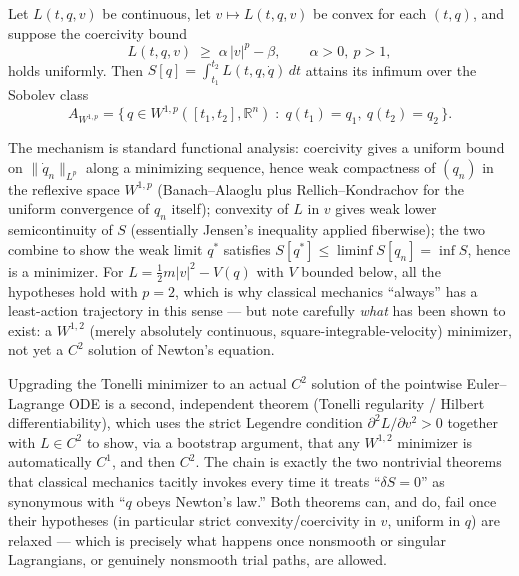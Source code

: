 \begin{theorem}
\label{tonelli}
Let $L(t,q,v)$ be continuous, let $v\mapsto L(t,q,v)$ be convex for each $(t,q)$, and suppose the coercivity bound
\[
L(t,q,v) \;\ge\; \alpha\,|v|^p - \beta, \qquad \alpha>0,\ p>1,
\]
holds uniformly. Then $S[q]=\int_{t_1}^{t_2}L(t,q,\dot q)\,dt$ attains its infimum over the Sobolev class
\[
A_{W^{1,p}} = \bigl\{\, q\in W^{1,p}([t_1,t_2],\mathbb{R}^n) \;:\; q(t_1)=q_1,\ q(t_2)=q_2 \,\bigr\}.
\]
\end{theorem}

The mechanism is standard functional analysis: coercivity gives a uniform bound
on $\|\dot q_n\|_{L^p}$ along a minimizing sequence, hence weak compactness of
$(q_n)$ in the reflexive space $W^{1,p}$ (Banach--Alaoglu plus
Rellich--Kondrachov for the uniform convergence of $q_n$ itself); convexity of
$L$ in $v$ gives weak lower semicontinuity of $S$ (essentially Jensen's
inequality applied fiberwise); the two combine to show the weak limit $q^\ast$
satisfies $S[q^\ast]\le \liminf S[q_n] = \inf S$, hence is a minimizer. For
$L=\tfrac12 m|v|^2 - V(q)$ with $V$ bounded below, all the hypotheses hold with
$p=2$, which is why classical mechanics ``always'' has a least-action
trajectory in this sense --- but note carefully \emph{what} has been shown to
exist: a $W^{1,2}$ (merely absolutely continuous, square-integrable-velocity)
minimizer, not yet a $C^2$ solution of Newton's equation.

Upgrading the Tonelli minimizer to an actual $C^2$ solution of the pointwise
Euler--Lagrange ODE is a second, independent theorem (Tonelli regularity /
Hilbert differentiability), which uses the strict Legendre condition
$\partial^2 L/\partial v^2 > 0$ together with $L\in C^2$ to show, via a
bootstrap argument, that any $W^{1,2}$
minimizer is automatically $C^1$, and then $C^2$. The chain
is exactly the two nontrivial theorems that classical mechanics tacitly invokes
every time it treats ``$\delta S=0$'' as synonymous with ``$q$ obeys Newton's
law.'' Both theorems can, and do, fail once their hypotheses (in particular
strict convexity/coercivity in $v$, uniform in $q$) are relaxed --- which is
precisely what happens once nonsmooth or singular Lagrangians, or genuinely
nonsmooth trial paths, are allowed.


